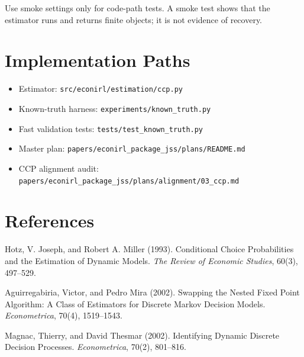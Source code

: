 \documentclass[10pt]{article}
\begin{document}
Use smoke settings only for code-path tests. A smoke test shows that the
estimator runs and returns finite objects; it is not evidence of recovery.

\section{Implementation Paths}

\begin{itemize}
\item Estimator: \texttt{src/econirl/estimation/ccp.py}
\item Known-truth harness: \texttt{experiments/known\_truth.py}
\item Fast validation tests: \texttt{tests/test\_known\_truth.py}
\item Master plan: \texttt{papers/econirl\_package\_jss/plans/README.md}
\item CCP alignment audit: \texttt{papers/econirl\_package\_jss/plans/alignment/03\_ccp.md}
\end{itemize}

\section{References}

Hotz, V. Joseph, and Robert A. Miller (1993). Conditional Choice Probabilities
and the Estimation of Dynamic Models. \emph{The Review of Economic Studies},
60(3), 497--529.

Aguirregabiria, Victor, and Pedro Mira (2002). Swapping the Nested Fixed Point
Algorithm: A Class of Estimators for Discrete Markov Decision Models.
\emph{Econometrica}, 70(4), 1519--1543.

Magnac, Thierry, and David Thesmar (2002). Identifying Dynamic Discrete
Decision Processes. \emph{Econometrica}, 70(2), 801--816.
\end{document}
